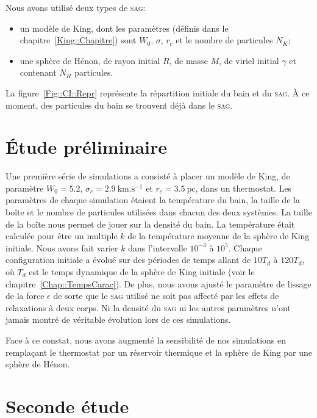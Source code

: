 	Nous avons utilisé deux types de \textsc{sag}:
	\begin{itemize}
		\item un modèle de King, dont les paramètres (définis dans le chapitre~\ref{King::Chapitre}) sont $W_0$, $\sigma$, $r_c$ et le nombre
			de particules $N_K$;
		\item une sphère de Hénon, de rayon initial $R$, de masse $M$, de viriel initial $\gamma$ et contenant $N_H$ particules.
	\end{itemize}

	La figure~\ref{Fig::CI::Repr} représente la répartition initiale du bain et du \textsc{sag}. À ce moment, des particules du bain se trouvent déjà dans le \textsc{sag}.

\section{Étude préliminaire}

	Une première série de simulations a consisté à placer un modèle de King, de paramètre $W_0 = 5.2$, $\sigma_c = 2.9\
	\mathrm{km}.\mathrm{s}^{-1}$ et $r_c = 3.5\ \mathrm{pc}$, dans un thermostat. Les paramètres de chaque simulation étaient la température du
	bain, la taille de la boîte et le nombre de particules utilisées dans chacun des deux systèmes. La taille de la boîte nous permet de jouer sur
	la densité du bain. La température était calculée pour être un multiple $k$ de la température moyenne de la sphère de King initiale. Nous
	avons fait varier $k$ dans l'intervalle $10^{-3}$ à $10^5$. Chaque configuration initiale a évolué sur des périodes de temps allant de $10T_d$
	à $120T_d$, où $T_d$ est le temps dynamique de la sphère de King initiale (voir le chapitre~\ref{Chap::TempsCarac}). De plus, nous avons
	ajusté le paramètre de lissage de la force $\epsilon$ de sorte que le \textsc{sag} utilisé ne soit pas affecté par les effets de relaxations à deux
	corps. Ni la densité du \textsc{sag} ni les autres paramètres n'ont jamais montré de véritable évolution lors de ces simulations.


	Face à ce constat, nous avons augmenté la sensibilité de nos simulations en remplaçant le thermostat par un réservoir thermique et la
	sphère de King par une sphère de Hénon.

\section{Seconde étude}\label{Sec::2ndStudy}

